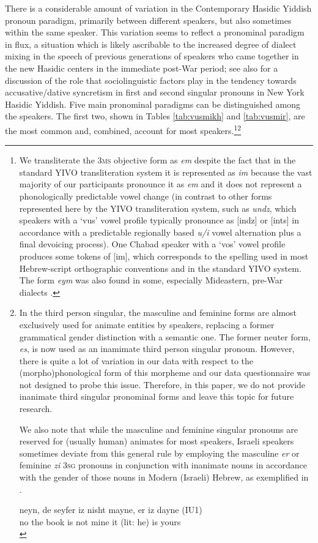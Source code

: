 \documentclass[output=paper, hidelinks]{langscibook}
\begin{document}
There is a considerable amount of variation in the Contemporary Hasidic Yiddish pronoun paradigm, primarily between different speakers, but also sometimes within the same speaker. This variation seems to reflect a pronominal paradigm in flux, a situation which is likely ascribable to the increased degree of dialect mixing in the speech of previous generations of speakers who came together in the new Hasidic centers in the immediate post-War period; see also \citet{Nove18} for a discussion of the role that sociolinguistic factors play in the tendency towards accusative/dative syncretism in first and second singular pronouns in New York Hasidic Yiddish.
Five main pronominal paradigms can be distinguished among the speakers. The first two, shown in Tables \ref{tab:vusmikh} and \ref{tab:vusmir}, are the most common and, combined, account for most speakers.\footnote{We transliterate the 3\textsc{ms} objective form as \textit{em} despite the fact that in the standard YIVO transliteration system it is represented as \textit{im} because the vast majority of our participants pronounce it as \textit{em} and it does not represent a phonologically predictable vowel change (in contrast to other forms represented here by the YIVO transliteration system, such as \textit{undz}, which speakers with a `vus' vowel profile typically pronounce as [indz] or [ints] in accordance with a predictable regionally based \textit{u/i} vowel alternation plus a final devoicing process). One Chabad speaker with a ‘vos’ vowel profile produces some tokens of [im], which corresponds to the spelling used in most Hebrew-script orthographic conventions and in the standard YIVO system. The form \textit{eym} was also found in some, especially Mideastern, pre-War dialects \citep{Weinreich64, Jacobs05}.}\footnote{In the third person singular, the masculine and feminine forms are almost exclusively used for animate entities by speakers, replacing a former grammatical gender distinction with a semantic one. The former neuter form, \textit{es}, is now used as an inamimate third person singular pronoun. However, there is quite a lot of variation in our data with respect to the (morpho)phonological form of this morpheme and our data questionnaire was not designed to probe this issue. Therefore, in this paper, we do not provide inanimate third singular pronominal forms and leave this topic for future research.

We also note that while the masculine and feminine singular pronouns are reserved for (usually human) animates for most speakers, Israeli speakers sometimes deviate from this general rule by employing the masculine \textit{er} or feminine \textit{zi} 3\textsc{sg} pronouns in conjunction with inanimate nouns in accordance with the gender of those nouns in Modern (Israeli) Hebrew, as exemplified in . 

\ea\label{ex:foo9} \gll neyn, de seyfer iz nisht mayne, er iz dayne (IU1) \\
no the book is not mine {it (lit: he)} is yours\\
\z
}
\end{document}
